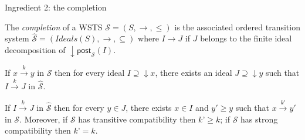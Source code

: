\documentclass{beamer}
\newcommand{\post}{\textsf{post}}
\begin{document}
  \begin{frame}{Ingredient 2: the completion}
 
 
 \begin{definition}
The \emph{completion}   of a WSTS $\mathscr{S}=(S,\rightarrow, \leq)$ is the associated ordered transition system $\hat{\mathscr{S}}=(Ideals(S),\rightarrow, \subseteq)$ where 
 $I \rightarrow J$ if $J$ belongs to the finite ideal decomposition of $\mathop{\downarrow} \post_{\mathscr{S}}(I)$. 
\end{definition}

\pause

\begin{exampleblock}{\cite[Proposition 30]{BFM-ic17}}
If $x \xrightarrow{k} y$ in $\mathscr{S}$ then for every ideal $I \supseteq \mathop{\downarrow} x$, there exists an ideal $J \supseteq \mathop{\downarrow} y$ such that $I \xrightarrow{k} J$ in $\hat{\mathscr{S}}$.
\end{exampleblock}

\pause

\begin{exampleblock}{\cite[Proposition 29]{BFM-ic17}}
If $I \xrightarrow{k} J$ in $\hat{\mathscr{S}}$ then for every $y \in J$, there exists $x \in I$ and $y' \geq y$ such that $x \xrightarrow{k'} y'$ in $\mathscr{S}$. Moreover, if $\mathscr{S}$ has transitive compatibility then $k’ \geq k$; if $\mathscr{S}$ has strong compatibility then $k’ = k$.
\end{exampleblock}




 
  

  \end{frame}
\end{document}
